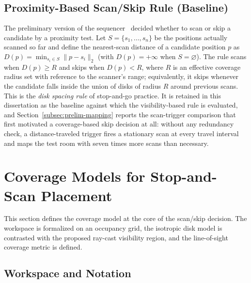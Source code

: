 \subsection{Proximity-Based Scan/Skip Rule (Baseline)}
\label{subsec:proximity-rule}

The preliminary version of the sequencer~\cite{iccas2026} decided whether to
scan or skip a candidate by a proximity test. Let $S=\{s_1,\dots,s_n\}$ be the
positions actually scanned so far and define the nearest-scan distance of a
candidate position $p$ as $D(p)=\min_{s_i\in S}\lVert p-s_i\rVert_2$ (with
$D(p)=+\infty$ when $S=\varnothing$). The rule scans when $D(p)\ge R$ and skips
when $D(p)<R$, where $R$ is an effective coverage radius set with reference to
the scanner's range; equivalently, it skips whenever the candidate falls inside
the union of disks of radius $R$ around previous scans. This is the
\emph{disk spacing rule} of stop-and-go practice. It is retained in this
dissertation as the baseline against which the visibility-based rule is
evaluated, and Section~\ref{subsec:prelim-mapping} reports the scan-trigger
comparison that first motivated a coverage-based skip decision at all: without
any redundancy check, a distance-traveled trigger fires a stationary scan at
every travel interval and maps the test room with seven times more scans than
necessary.

\section{Coverage Models for Stop-and-Scan Placement}
\label{sec:coverage}

This section defines the coverage model at the core of the scan/skip decision.
The workspace is formalized on an occupancy grid, the isotropic disk model is
contrasted with the proposed ray-cast visibility region, and the line-of-sight
coverage metric is defined.

\subsection{Workspace and Notation}
\label{subsec:notation}

